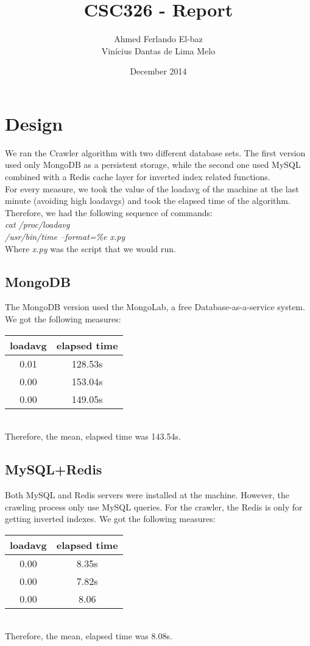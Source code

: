 \documentclass{article}
\title{CSC326 - Report}
\author{Ahmed Ferlando El-baz \\ Vinícius Dantas de Lima Melo}
\date{December 2014}
\begin{document}
\maketitle

\section{Design}
We ran the Crawler algorithm with two different database sets. The first version used only MongoDB as a persistent storage, while the second one used MySQL combined with a Redis cache layer for inverted index related functions. \\
For every measure, we took the value of the loadavg of the machine at the last minute (avoiding high loadavgs) and took the elapsed time of the algorithm. Therefore, we had the following sequence of commands: \\
\textit{cat /proc/loadavg} \\
\textit{/usr/bin/time --format=\%e x.py} \\
Where \textit{x.py} was the script that we would run.

\subsection{MongoDB}
The MongoDB version used the MongoLab, a free Database-as-a-service system. We got the following measures: \\
\begin{tabular}{| c | c |}
  \hline                       
  loadavg& elapsed time \\
  \hline
  0.01 & 128.53s \\
  0.00 & 153.04s \\
  0.00 & 149.05s \\
  \hline  
\end{tabular} \\
Therefore, the mean, elapsed time was 143.54s.

\subsection{MySQL+Redis}
Both MySQL and Redis servers were installed at the machine. However, the crawling process only use MySQL queries. For the crawler, the Redis is only for getting inverted indexes. We got the following measures: \\
\begin{tabular}{| c | c |}
  \hline                       
  loadavg& elapsed time \\
  \hline
  0.00 & 8.35s \\
  0.00 & 7.82s \\
  0.00 & 8.06 \\
  \hline  
\end{tabular} \\
Therefore, the mean, elapsed time was 8.08s.
\end{document}
